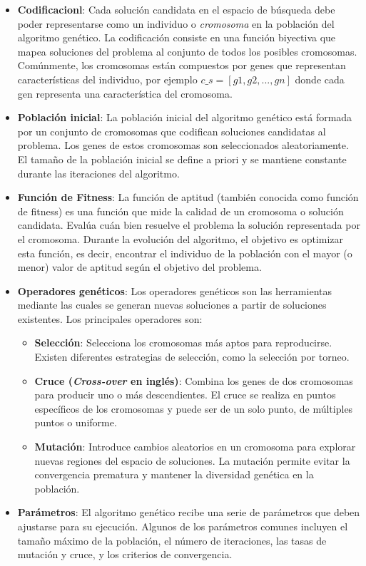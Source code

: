 \begin{itemize}
    \item  \textbf{Codificacionl}: Cada solución candidata en el espacio de búsqueda debe poder representarse como un individuo o \emph{cromosoma} en la población del algoritmo genético. La codificación consiste en una función biyectiva que mapea soluciones del problema al conjunto de todos los posibles cromosomas. Comúnmente, los cromosomas están compuestos por genes que representan características del individuo, por ejemplo  $c\_s = [g1, g2, ..., gn]$ donde cada gen representa una característica del cromosoma.


    \item \textbf{Población inicial}: La población inicial del algoritmo genético está formada por un conjunto de cromosomas que codifican soluciones candidatas al problema. Los genes de estos cromosomas son seleccionados aleatoriamente. El tamaño de la población inicial se define a priori y se mantiene constante durante las iteraciones del algoritmo.

    \item \textbf{Función de Fitness}: La función de aptitud (también conocida como función de fitness) es una función que mide la calidad de un cromosoma o solución candidata. Evalúa cuán bien resuelve el problema la solución representada por el cromosoma. Durante la evolución del algoritmo, el objetivo es optimizar esta función, es decir, encontrar el individuo de la población con el mayor (o menor) valor de aptitud según el objetivo del problema.

\item \textbf{Operadores genéticos}: Los operadores genéticos son las herramientas mediante las cuales se generan nuevas soluciones a partir de soluciones existentes. Los principales operadores son:
    \begin{itemize}
    \item \textbf{Selección}: Selecciona los cromosomas más aptos para reproducirse. Existen diferentes estrategias de selección, como la selección por torneo.

    \item \textbf{Cruce (\emph{Cross-over} en inglés)}: Combina los genes de dos cromosomas para producir uno o más descendientes. El cruce se realiza en puntos específicos de los cromosomas y puede ser de un solo punto, de múltiples puntos o uniforme.

    \item \textbf{Mutación}: Introduce cambios aleatorios en un cromosoma para explorar nuevas regiones del espacio de soluciones. La mutación permite evitar la convergencia prematura y mantener la diversidad genética en la población.
    \end{itemize}

\item \textbf{Par\'ametros}: El algoritmo genético recibe una serie de parámetros que deben ajustarse para su ejecución. Algunos de los parámetros comunes incluyen el tamaño máximo de la población, el número de iteraciones, las tasas de mutación y cruce, y los criterios de convergencia.
\end{itemize}

